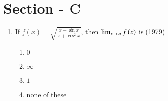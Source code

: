 \documentclass[journal]{IEEEtran}
\begin{document}
\section*{Section - C}
\begin{enumerate}
	\item{
 If $f(x) = \sqrt{\frac{x - \sin x}{x + \cos^2 x}}$, then $\lim_{x \to \infty} f\left(x\right)$ is \hfill (1979)

    \begin{multicols}{2}
    \begin{enumerate}
        \item{$0$}
        \item{$\infty$}
        \columnbreak
        \item{$1$}
        \item{none of these}
    \end{enumerate}
    \end{multicols}
 
}
\end{enumerate}
\end{document}
